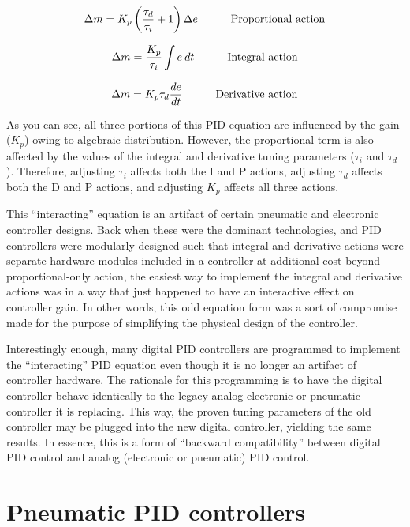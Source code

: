 $$\Delta m = K_p \left({\tau_d \over \tau_i} + 1\right) \Delta e \hskip 30pt \hbox{Proportional action}$$

$$\Delta m = {K_p \over \tau_i} \int e \> dt \hskip 30pt \hbox{Integral action}$$

$$\Delta m = K_p \tau_d {de \over dt} \hskip 30pt \hbox{Derivative action}$$

As you can see, all three portions of this PID equation are influenced by the gain ($K_p$) owing to algebraic distribution.  However, the proportional term is also affected by the values of the integral and derivative tuning parameters ($\tau_i$ and $\tau_d$).  Therefore, adjusting $\tau_i$ affects both the I and P actions, adjusting $\tau_d$ affects both the D and P actions, and adjusting $K_p$ affects all three actions.


This ``interacting'' equation is an artifact of certain pneumatic and electronic controller designs.  Back when these were the dominant technologies, and PID controllers were modularly designed such that integral and derivative actions were separate hardware modules included in a controller at additional cost beyond proportional-only action, the easiest way to implement the integral and derivative actions was in a way that just happened to have an interactive effect on controller gain.  In other words, this odd equation form was a sort of compromise made for the purpose of simplifying the physical design of the controller.

Interestingly enough, many digital PID controllers are programmed to implement the ``interacting'' PID equation even though it is no longer an artifact of controller hardware.  The rationale for this programming is to have the digital controller behave identically to the legacy analog electronic or pneumatic controller it is replacing.  This way, the proven tuning parameters of the old controller may be plugged into the new digital controller, yielding the same results.  In essence, this is a form of ``backward compatibility'' between digital PID control and analog (electronic or pneumatic) PID control.











\filbreak
\section{Pneumatic PID controllers}

